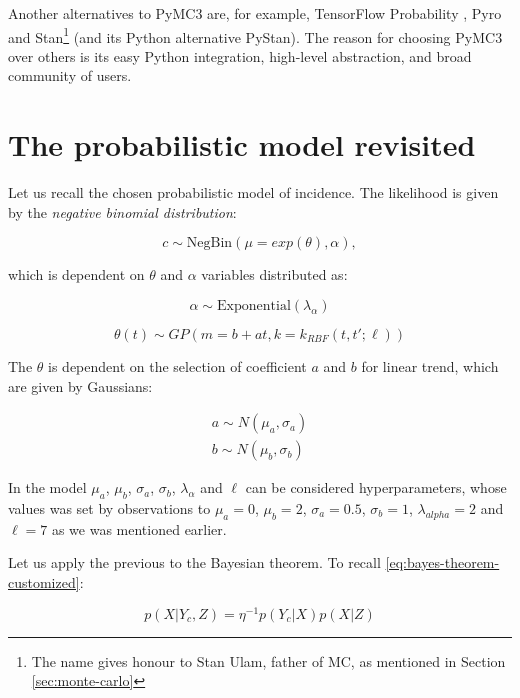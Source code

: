 \documentclass[
  digital, %
  oneside, %
  lof,     %
  lot,     %
]{fithesis4}
\begin{document}
Another alternatives to PyMC3 are, for example, TensorFlow Probability \cite{tfp}, Pyro \cite{pyro} and Stan\footnote{The name gives honour to Stan Ulam, father of MC, as mentioned in Section \ref{sec:monte-carlo}} \cite{stanmc} (and its Python alternative PyStan).
The reason for choosing PyMC3 over others is its easy Python integration, high-level abstraction, and broad community of users.


\section{The probabilistic model revisited}

Let us recall the chosen probabilistic model of incidence.
The likelihood is given by the \textit{negative binomial distribution}:

\begin{equation}
  c \sim \text{NegBin} (\mu=exp(\theta), \alpha),
\end{equation}

\noindent
which is dependent on $\theta$ and $\alpha$ variables distributed as:

\begin{equation}
  \alpha \sim \text{Exponential} (\lambda_\alpha)
\end{equation}

\begin{equation}
  \theta(t) \sim GP(m=b + at, k=k_{RBF} \left( t, t'; \ell \right))
\end{equation}

The $\theta$ is dependent on the selection of coefficient $a$ and $b$ for linear trend, which are given by Gaussians:

\begin{equation}
  \begin{split}
    a \sim N(\mu_a, \sigma_a) \\
    b \sim N(\mu_b, \sigma_b)
  \end{split}
\end{equation}

In the model $\mu_a$, $\mu_b$, $\sigma_a$, $\sigma_b$, $\lambda_\alpha$ and $\ell$ can be considered hyperparameters, whose values was set by observations to $\mu_a = 0$, $\mu_b = 2$, $\sigma_a = 0.5$, $\sigma_b = 1$, $\lambda_{alpha} = 2$ and $\ell = 7$ as we was mentioned earlier.

Let us apply the previous to the Bayesian theorem.
To recall \eqref{eq:bayes-theorem-customized}:

\begin{equation}
  p( X | Y_c, Z ) = \eta^{-1} p( Y_c | X ) p(X | Z)
\end{equation}
\end{document}
